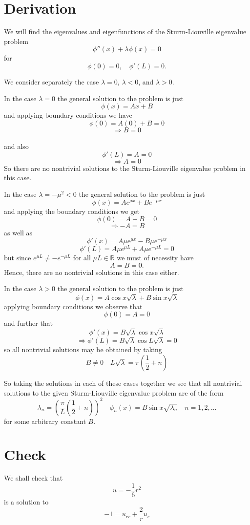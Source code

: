 \documentclass[12pt]{article}
\begin{document}
\appendix

\section{Derivation}\label{slproblem}
We will find the eigenvalues and eigenfunctions of the Sturm-Liouville eigenvalue problem 
\[\phi''(x) +\lambda \phi(x) = 0\]
for 
\[\phi(0)=0,\quad \phi'(L)=0.\]

We consider separately the case $\lambda=0$, $\lambda<0$, and $\lambda>0$.

In the case $\lambda=0$ the general solution to the problem is just 
\[\phi(x) = Ax+B\]
and applying boundary conditions we have 
\[ \phi(0) = A(0)+B=0 \]
\[\Rightarrow B = 0\]\\
and also
\[ \phi'(L) = A= 0\]
\[\Rightarrow A=0\]
So there are no nontrivial solutions to the Sturm-Liouville eigenvalue problem in this case.

In the case $\lambda=-\mu^2<0$ the general solution to the problem is just 
\[\phi(x)=Ae^{\mu x}+Be^{-\mu x}\]
and applying the boundary conditions we get 
\[\phi(0)=A+B=0\]
\[\Rightarrow-A=B\]
as well as 
\[\phi'(x)=A\mu e^{\mu x}-B \mu e^{-\mu x}\]
\[\phi'(L)=A\mu e^{\mu L}+A \mu e^{-\mu L}=0\]
but since $e^{\mu L} \neq -e^{-\mu L}$ for all $\mu L \in \mathbb{R}$ we must of necessity have
\[A=B=0.\]
Hence, there are no nontrivial solutions in this case either.

In the case $\lambda>0$ the general solution to the problem is just 
\[\phi(x) = A\cos{x\sqrt{\lambda}}+B \sin{x \sqrt{\lambda}}\]
applying boundary conditions we observe that
\[\phi(0) = A=0\]
and further that
\[\phi'(x) = B\sqrt{\lambda} \cos{x \sqrt{\lambda}}\]
\[\Rightarrow \phi'(L) = B\sqrt{\lambda} \cos{L \sqrt{\lambda}}=0\]
so all nontrivial solutions may be obtained by taking
\[B\neq 0 \quad  L\sqrt{\lambda}=\pi \left( \frac{1}{2} + n \right) \]

So taking the solutions in each of these cases together we see that all nontrivial solutions to the given Sturm-Liouville eigenvalue problem are of the form
\[ \lambda_n=\left( \frac{\pi}{L} \left( \frac{1}{2} + n \right) \right)^2  \quad \phi_n(x) =B \sin{x \sqrt{\lambda_n}} \quad n=1,2,\dots\]
for some arbitrary constant $B$.

\section{Check}\label{check}
We shall check that 
\[u=-\frac{1}{6} r^2\]
is a solution to
\[-1 = u_{rr} +\frac{2}{r} u_r \]
\end{document}

